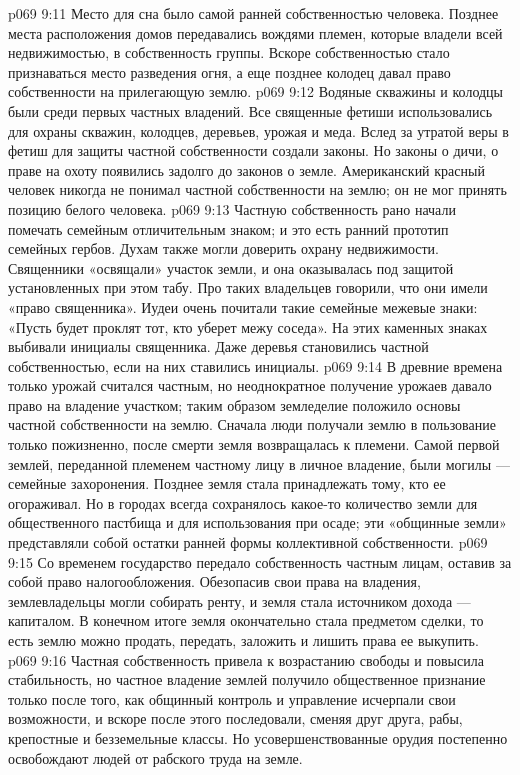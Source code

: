 \vs p069 9:11 \pc Место для сна было самой ранней собственностью человека. Позднее места расположения домов передавались вождями племен, которые владели всей недвижимостью, в собственность группы. Вскоре собственностью стало признаваться место разведения огня, а еще позднее колодец давал право собственности на прилегающую землю.
\vs p069 9:12 Водяные скважины и колодцы были среди первых частных владений. Все священные фетиши использовались для охраны скважин, колодцев, деревьев, урожая и меда. Вслед за утратой веры в фетиш для защиты частной собственности создали законы. Но законы о дичи, о праве на охоту появились задолго до законов о земле. Американский красный человек никогда не понимал частной собственности на землю; он не мог принять позицию белого человека.
\vs p069 9:13 Частную собственность рано начали помечать семейным отличительным знаком; и это есть ранний прототип семейных гербов. Духам также могли доверить охрану недвижимости. Священники «освящали» участок земли, и она оказывалась под защитой установленных при этом табу. Про таких владельцев говорили, что они имели «право священника». Иудеи очень почитали такие семейные межевые знаки: «Пусть будет проклят тот, кто уберет межу соседа». На этих каменных знаках выбивали инициалы священника. Даже деревья становились частной собственностью, если на них ставились инициалы.
\vs p069 9:14 В древние времена только урожай считался частным, но неоднократное получение урожаев давало право на владение участком; таким образом земледелие положило основы частной собственности на землю. Сначала люди получали землю в пользование только пожизненно, после смерти земля возвращалась к племени. Самой первой землей, переданной племенем частному лицу в личное владение, были могилы --- семейные захоронения. Позднее земля стала принадлежать тому, кто ее огораживал. Но в городах всегда сохранялось какое\hyp{}то количество земли для общественного пастбища и для использования при осаде; эти «общинные земли» представляли собой остатки ранней формы коллективной собственности.
\vs p069 9:15 Со временем государство передало собственность частным лицам, оставив за собой право налогообложения. Обезопасив свои права на владения, землевладельцы могли собирать ренту, и земля стала источником дохода --- капиталом. В конечном итоге земля окончательно стала предметом сделки, то есть землю можно продать, передать, заложить и лишить права ее выкупить.
\vs p069 9:16 Частная собственность привела к возрастанию свободы и повысила стабильность, но частное владение землей получило общественное признание только после того, как общинный контроль и управление исчерпали свои возможности, и вскоре после этого последовали, сменяя друг друга, рабы, крепостные и безземельные классы. Но усовершенствованные орудия постепенно освобождают людей от рабского труда на земле.
